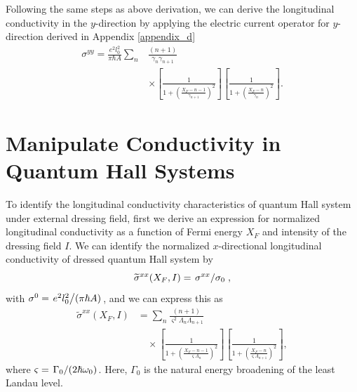 \documentclass[
 reprint,
 amsmath,amssymb,
 aps,
 prb,
]{revtex4-2}
\begin{document}
{Following the same steps as above derivation, we can derive the longitudinal conductivity in the $y$-direction by applying the electric current operator for $y$-direction derived in Appendix \ref{appendix_d}
\begin{equation} \label{eq:36}
  \begin{aligned}
    {\sigma}^{yy} =
    \frac{e^2l_0^2}{\pi\hbar A}
    \sum_{n} &
    \frac{(n+1)}{\gamma_{n}\gamma_{n+1}} \\
    &\times
    \left[
      \frac{1}
      {
        1 + \left(\frac{X_F - n -1}{\gamma_{n+1}}\right)^2
      }
    \right]
    \left[
      \frac{1}
      {
        1 + \left(\frac{X_F - n}{\gamma_{n}}\right)^2
      }
    \right].
  \end{aligned}
\end{equation}
}

\section{\label{sec:manipulate_conductivity} Manipulate Conductivity in Quantum Hall Systems}

To identify the longitudinal conductivity characteristics of quantum Hall system under external dressing field, first we derive an expression for normalized longitudinal conductivity as a function of Fermi energy $X_F$ and intensity of the dressing field $I$.
We can identify the normalized $x$-directional longitudinal conductivity of dressed quantum Hall system by
\begin{equation}\label{eq:37}
  \widetilde{\sigma}^{xx}(X_F,I) =
  \flatfrac{\sigma^{xx}}{\sigma_{0}},
\end{equation}
with {\color{Red}$\sigma^0 = \flatfrac{e^2l_0^2}{(\pi \hbar A)}$}, and we can express this as
\begin{equation} \label{eq:38}
  \begin{aligned}
    \widetilde{\sigma}^{xx}(X_F,I) &=
    \sum_{n}
    \frac{(n+1)}{\varsigma^2 \Lambda_n \Lambda_{n+1}} \\
    &\quad\times
    \left[
      \frac{1}
      {
        1 + \left(\frac{X_F - n -1}{\varsigma \Lambda_n}\right)^2
      }
    \right]
    \left[
      \frac{1}
      {
        1 + \left(\frac{X_F - n}{\varsigma \Lambda_{n+1}}\right)^2
      }
    \right],
  \end{aligned}
\end{equation}
where $\varsigma = \flatfrac{\Gamma_0}{(2\hbar \omega_0)}$. Here, $\Gamma_0$ is the natural energy broadening of the least Landau level.
\end{document}
